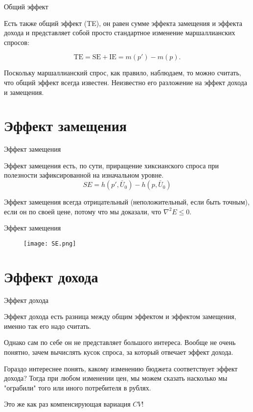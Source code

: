 \documentclass{beamer}
\begin{document}
\begin{frame}{Общий эффект}

Есть также общий эффект (TE), он равен сумме эффекта замещения и эффекта дохода и представляет собой просто стандартное изменение маршаллианских спросов:

$$ \text{TE} = \text{SE} + \text{IE} = m(p') - m(p).$$

Поскольку маршаллианский спрос, как правило, наблюдаем, то можно считать, что общий эффект всегда известен. Неизвестно его разложение на эффект дохода и замещения.

\end{frame}

\section{Эффект замещения}

\begin{frame}{Эффект замещения}

Эффект замещения есть, по сути, приращение хиксианского спроса при полезности зафиксированной на изначальном уровне. 
$$ SE = h(p', \bar U_0) - h(p, \bar U_0) $$

Эффект замещения всегда отрицательный (неположительный, если быть точным), если он по своей цене, потому что мы доказали, что $\nabla^2 E \leqslant 0$.

\end{frame}

\begin{frame}{Эффект замещения}

\begin{figure}[hbt]
\centering
\texttt{[image: SE.png]}
\end{figure}

\end{frame}

\section{Эффект дохода}

\begin{frame}{Эффект дохода}

Эффект дохода есть разница между общим эффектом и эффектом замещения, именно так его надо считать. 

Однако сам по себе он не представляет большого интереса. Вообще не очень понятно, зачем вычислять кусок спроса, за который отвечает эффект дохода. 

Гораздо интереснее понять, какому изменению бюджета соответствует эффект дохода? Тогда при любом изменении цен, мы можем сказать насколько мы "ограбили" того или иного потребителя в рублях.

Это же как раз компенсирующая вариация $CV$!

\end{frame}
\end{document}
